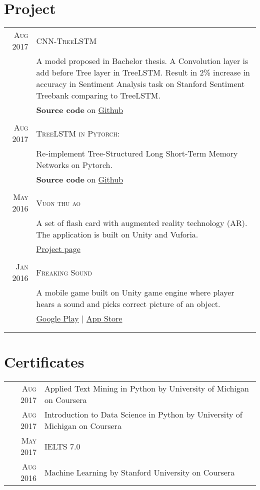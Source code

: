 \documentclass[a4paper,10pt]{article}
\begin{document}
\section{Project}
\begin{tabularx}{\textwidth}{r|X}
  \textsc{Aug 2017} &\textsc{CNN-TreeLSTM} \\
  & A model proposed in Bachelor thesis. A Convolution layer is add before Tree layer in TreeLSTM. Result in 2\% increase in accuracy in Sentiment Analysis task on Stanford Sentiment Treebank comparing to TreeLSTM.\\
& \textbf{Source code} on \href{https://github.com/ttpro1995/Tree_CNN_LSTM}{Github}\\
\multicolumn{2}{c}{} \\

  \textsc{Aug 2017}&\textsc{TreeLSTM in Pytorch:} \\
 &Re-implement Tree-Structured Long Short-Term Memory Networks on Pytorch. \\
& \textbf{Source code} on \href{https://github.com/ttpro1995/TreeLSTMSentiment}{Github}\\
\multicolumn{2}{c}{} \\

  \textsc{May 2016}&\textsc{Vuon thu ao}\\
 &A set of flash card with augmented reality technology (AR). The application is built on Unity and Vuforia.\\
&  \href{http://www.vuonthuao.com/}{Project page}\\
\multicolumn{2}{c}{} \\

 \textsc{Jan 2016}&\textsc{Freaking Sound}\\
 &A mobile game built on Unity game engine where player hears a sound and picks correct picture of an object.\\
&  \href{https://play.google.com/store/apps/details?id=com.piksalstudio.freakingsound}{Google Play} | \href{https://itunes.apple.com/us/app/freaking-sound/id1081268019?mt=8}{App Store}\\ \\ 
\multicolumn{2}{c}{} \\

\end{tabularx}

\section{Certificates}
\begin{tabularx}{\textwidth}{r|X}
\textsc{Aug 2017} &Applied Text Mining in Python by University of Michigan on Coursera \\
\textsc{Aug 2017} &Introduction to Data Science in Python by University of Michigan on Coursera \\ 
 \textsc{May 2017} &IELTS 7.0\\
 \textsc{Aug 2016} &Machine Learning by Stanford University on Coursera \\

\end{tabularx}
\end{document}

